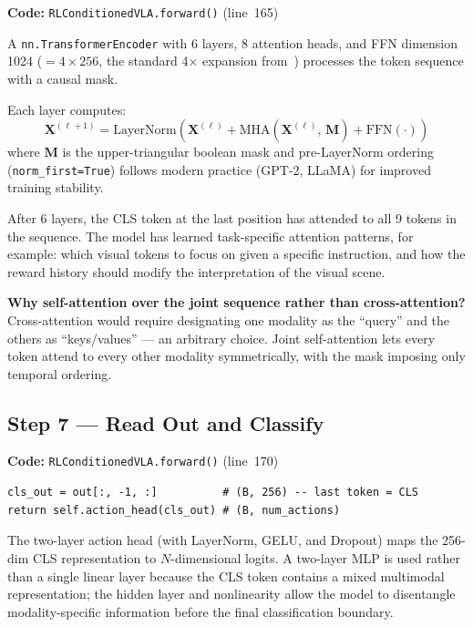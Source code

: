 \documentclass[12pt, a4paper]{article}
\begin{document}
\textbf{Code:} \texttt{RLConditionedVLA.forward()} (line~165)

A \texttt{nn.TransformerEncoder} with 6 layers, 8 attention heads, and
FFN dimension 1024 ($= 4 \times 256$, the standard 4$\times$ expansion
from~\cite{vaswani2017attention}) processes the token sequence with a
causal mask.

Each layer computes:
\[
  \mathbf{X}^{(\ell+1)} = \mathrm{LayerNorm}\!\left(
    \mathbf{X}^{(\ell)} + \mathrm{MHA}\!\left(\mathbf{X}^{(\ell)},\,\mathbf{M}\right)
    + \mathrm{FFN}\!\left(\cdot\right)
  \right)
\]
where $\mathbf{M}$ is the upper-triangular boolean mask and pre-LayerNorm
ordering (\texttt{norm\_first=True}) follows modern practice (GPT-2, LLaMA)
for improved training stability.

After 6 layers, the CLS token at the last position has attended to all
9 tokens in the sequence.
The model has learned task-specific attention patterns, for example:
which visual tokens to focus on given a specific instruction, and how
the reward history should modify the interpretation of the visual scene.

\textbf{Why self-attention over the joint sequence rather than cross-attention?}
Cross-attention would require designating one modality as the ``query'' and
the others as ``keys/values'' — an arbitrary choice.
Joint self-attention lets every token attend to every other modality
symmetrically, with the mask imposing only temporal ordering.

\subsection{Step 7 — Read Out and Classify}
\label{sec:step7}

\textbf{Code:} \texttt{RLConditionedVLA.forward()} (line~170)

\begin{lstlisting}[style=Python, caption={CLS read-out and action classification.}]
cls_out = out[:, -1, :]          # (B, 256) -- last token = CLS
return self.action_head(cls_out) # (B, num_actions)
\end{lstlisting}

The two-layer action head (with LayerNorm, GELU, and Dropout) maps the
256-dim CLS representation to $N$-dimensional logits.
A two-layer MLP is used rather than a single linear layer because the CLS
token contains a mixed multimodal representation; the hidden layer and
nonlinearity allow the model to disentangle modality-specific information
before the final classification boundary.
\end{document}
